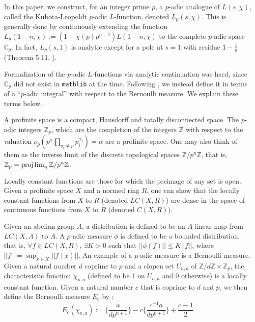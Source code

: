 \documentclass[a4paper,UKenglish,cleveref, autoref, thm-restate]{lipics-v2021}
\newcommand{\lean}[1]{\texttt{#1}\xspace} %
\begin{document}
In this paper, we construct, for an integer prime $p$, a $p$-adic analogue of $L(s, \chi)$, 
called the Kubota-Leopoldt $p$-adic $L$-function, denoted $L_p(s, \chi)$. This is generally done by continuously extending the function 
$L_p(1 - n, \chi) := (1 - \chi (p) p^{n - 1}) L(1 - n, \chi)$ to the complete $p$-adic space 
$\mathbb{C}_p$. In fact, $L_p(s, 1)$ is analytic except for a pole at $s = 1$ with residue 
$1 - \frac{1}{p}$ (Theorem 5.11, \cite{cyc}). 

Formalization of the $p$-adic $L$-functions via analytic continuation was hard, since $\mathbb{C}_p$ did not exist 
in \lean{mathlib} at the time. Following \cite{cyc}, 
we instead define it in terms of a ``$p$-adic integral'' with respect to the Bernoulli measure. We explain these terms below. 

A profinite space is a compact, Hausdorff and totally disconnected space. The $p$-adic integers 
$\mathbb{Z}_p$, which are the completion of the integers $\mathbb{Z}$ with respect to the 
valuation $\nu_p(p^{\alpha} \prod_{p_i \ne p} p_i^{\alpha_i}) = \alpha$ are a profinite space. 
One may also think of them as the inverse limit of the discrete topological spaces 
$\mathbb{Z} / p^{n} \mathbb{Z}$, that is, $\mathbb{Z}_p = \projlim_{n} \mathbb{Z} / p^{n} \mathbb{Z}$. 

Locally constant functions are those for which the preimage of any set is open. Given a profinite space $X$ and a normed ring $R$, 
one can show that the locally constant functions from $X$ to $R$ (denoted $LC(X, R)$) are dense in the space of continuous 
functions from $X$ to $R$ (denoted $C(X, R)$).

Given an abelian group $A$, a distribution is defined to be an $A$-linear map from $LC(X, A)$ 
to $A$. A $p$-adic measure $\phi$ is defined to be a bounded distribution, that is, $\forall f \in LC(X, R)$, 
$\exists K > 0$ such that $|| \phi (f) || \le K ||f|| $, where $||f|| = \sup_{x \in X} || f(x)||$. 
An example of a $p$-adic measure is a Bernoulli measure. Given a natural number $d$ coprime to $p$ and a clopen set $U_{n, a}$ of 
$\mathbb{Z}/ d \mathbb{Z} \times \mathbb{Z}_p$, the characteristic function $\chi_{n, a}$ 
(defined to be 1 on $U_{n, a}$ and 0 otherwise) is a locally constant function. 
Given a natural number $c$ that is coprime to $d$ and $p$, we then define the Bernoulli measure $E_c$ by :
$$ E_c(\chi_{n, a}) := \bigg \{ \frac{a}{d p^{n + 1}} \bigg \} - c \bigg \{ \frac{c^{-1} a}{d p^{n + 1}} \bigg \} + \frac{c - 1}{2} $$
\end{document}
